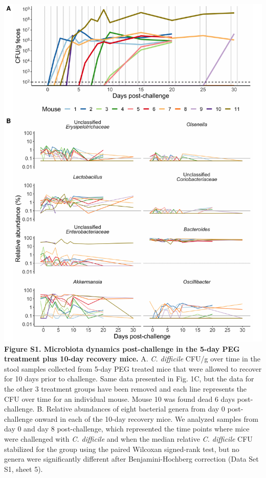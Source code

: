 \documentclass[
  11pt,
]{article}
\begin{document}
\includegraphics{figure_S1.pdf} \textbf{Figure S1. Microbiota dynamics
post-challenge in the 5-day PEG treatment plus 10-day recovery mice.} A.
\emph{C. difficile} CFU/g over time in the stool samples collected from
5-day PEG treated mice that were allowed to recover for 10 days prior to
challenge. Same data presented in Fig. 1C, but the data for the other 3
treatment groups have been removed and each line represents the CFU over
time for an individual mouse. Mouse 10 was found dead 6 days
post-challenge. B. Relative abundances of eight bacterial genera from
day 0 post-challenge onward in each of the 10-day recovery mice. We
analyzed samples from day 0 and day 8 post-challenge, which represented
the time points where mice were challenged with \emph{C. difficile} and
when the median relative \emph{C. difficile} CFU stabilized for the
group using the paired Wilcoxan signed-rank test, but no genera were
significantly different after Benjamini-Hochberg correction (Data Set
S1, sheet 5). \newpage
\end{document}
